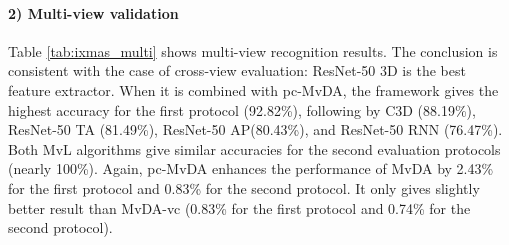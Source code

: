     \paragraph{2) Multi-view validation} Table \ref{tab:ixmas_multi} shows multi-view recognition results. The conclusion is consistent with the case of cross-view evaluation: ResNet-50 3D is the best feature extractor. When it is combined with pc-MvDA, the framework gives the highest accuracy for the first protocol (92.82\%), following by C3D (88.19\%), ResNet-50 TA (81.49\%), ResNet-50 AP(80.43\%), and ResNet-50 RNN (76.47\%). Both MvL algorithms give similar accuracies for the second evaluation protocols (nearly 100\%). Again, pc-MvDA enhances the performance of MvDA by 2.43\% for the first protocol and 0.83\% for the second protocol. It only gives slightly better result than MvDA-vc (0.83\% for the first protocol and 0.74\% for the second protocol). 

    \begin{table}[htbp]
    \centering
    \caption{Multi-view recognition comparison on IXMAS dataset}
    \label{tab:ixmas_multi}
    \end{table}

